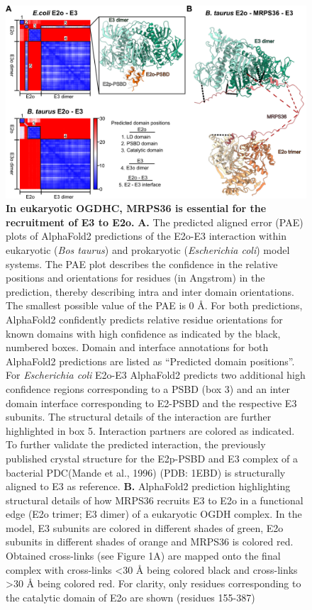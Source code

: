 \begin{figure}[htb!]
    \centering
    \includegraphics[]{Chapter.5/Figures/Figure4.png}
    \caption{\textbf{In eukaryotic OGDHC, MRPS36 is essential for the recruitment of E3 to E2o.} \textbf{A.} The predicted aligned error (PAE) plots of AlphaFold2 predictions of the E2o-E3 interaction within eukaryotic (\emph{Bos taurus}) and prokaryotic (\emph{Escherichia coli}) model systems. The PAE plot describes the confidence in the relative positions and orientations for residues (in Angstrom) in the prediction, thereby describing intra and inter domain orientations. The smallest possible value of the PAE is 0 Å. For both predictions, AlphaFold2 confidently predicts relative residue orientations for known domains with high confidence as indicated by the black, numbered boxes. Domain and interface annotations for both AlphaFold2 predictions are listed as “Predicted domain positions”. For \emph{Escherichia coli} E2o-E3 AlphaFold2 predicts two additional high confidence regions corresponding to a PSBD (box 3) and an inter domain interface corresponding to E2-PSBD and the respective E3 subunits. The structural details of the interaction are further highlighted in box 5. Interaction partners are colored as indicated. To further validate the predicted interaction, the previously published crystal structure for the E2p-PSBD and E3 complex of a bacterial PDC(Mande et al., 1996) (PDB: 1EBD) is structurally aligned to E3 as reference. \textbf{B.} AlphaFold2 prediction highlighting structural details of how MRPS36 recruits E3 to E2o in a functional edge (E2o trimer; E3 dimer) of a eukaryotic OGDH complex. In the model, E3 subunits are colored in different shades of green, E2o subunits in different shades of orange and MRPS36 is colored red. Obtained cross-links (see Figure 1A) are mapped onto the final complex with cross-links <30 Å being colored black and cross-links >30 Å being colored red. For clarity, only residues corresponding to the catalytic domain of E2o are shown (residues 155-387)}
    \label{fig:ch5_fig4}
\end{figure}

